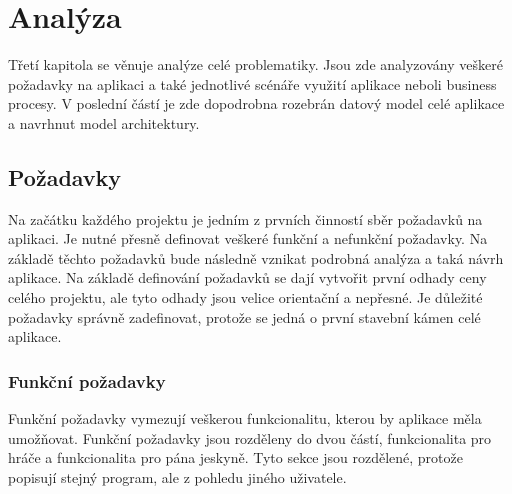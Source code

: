 \documentclass[thesis=B,czech]{resources/FITthesis}[2012/06/26]
\begin{document}
\chapter{Analýza}
Třetí kapitola se věnuje analýze celé problematiky. Jsou zde analyzovány veškeré požadavky na aplikaci a také jednotlivé scénáře využití aplikace neboli business procesy.  V poslední částí je zde dopodrobna rozebrán datový model celé aplikace  a navrhnut model architektury. 

	\section{Požadavky}
Na začátku každého projektu je jedním z prvních činností sběr požadavků na aplikaci. Je nutné přesně definovat veškeré funkční a nefunkční požadavky. Na základě těchto požadavků bude následně vznikat podrobná analýza a taká návrh aplikace. Na základě definování požadavků se dají vytvořit první odhady ceny celého projektu, ale tyto odhady jsou velice orientační a nepřesné. Je důležité požadavky správně zadefinovat, protože se jedná o první stavební kámen celé aplikace. 

\subsection{Funkční požadavky}
Funkční požadavky vymezují veškerou funkcionalitu, kterou by aplikace měla umožňovat. Funkční požadavky jsou rozděleny do dvou částí, funkcionalita pro hráče a funkcionalita pro pána jeskyně. Tyto sekce jsou rozdělené, protože popisují stejný program, ale z pohledu jiného uživatele.
\end{document}
